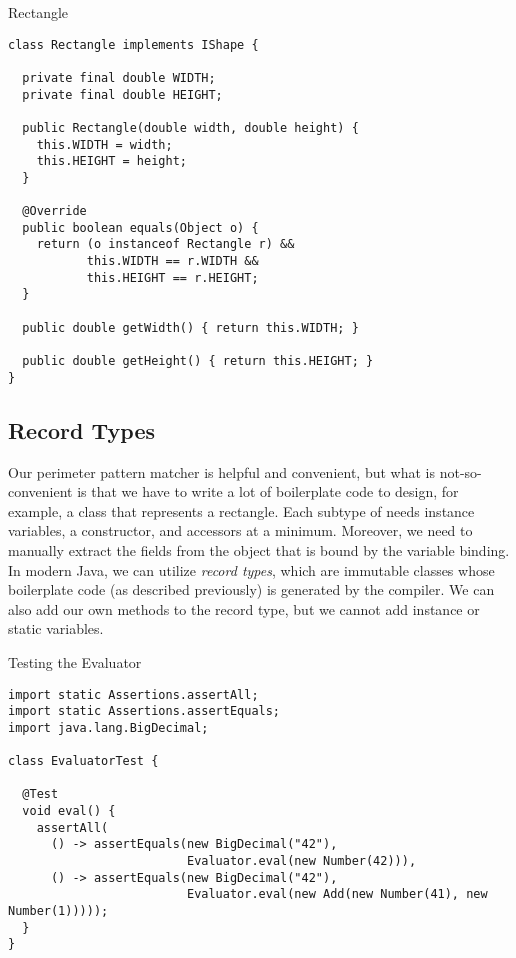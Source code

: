 \begin{cl}[]{Rectangle}
\begin{lstlisting}[language=MyJava]
class Rectangle implements IShape {

  private final double WIDTH;
  private final double HEIGHT;

  public Rectangle(double width, double height) {
    this.WIDTH = width;
    this.HEIGHT = height;
  }

  @Override
  public boolean equals(Object o) {
    return (o instanceof Rectangle r) &&
           this.WIDTH == r.WIDTH &&
           this.HEIGHT == r.HEIGHT;
  }

  public double getWidth() { return this.WIDTH; }

  public double getHeight() { return this.HEIGHT; }
}
\end{lstlisting}
\end{cl}


\subsection*{Record Types}

Our perimeter pattern matcher is helpful and convenient, but what is not-so-convenient is that we have to write a lot of boilerplate code to design, for example, a class that represents a rectangle. Each subtype of  needs instance variables, a constructor, and accessors at a minimum. Moreover, we need to manually extract the fields from the object that is bound by the variable binding. In modern Java, we can utilize \textit{record types}, which are immutable classes whose boilerplate code (as described previously) is generated by the compiler. We can also add our own methods to the record type, but we cannot add instance or static variables.


\begin{cl}[]{Testing the Evaluator}
\begin{lstlisting}[language=MyJava]
import static Assertions.assertAll;
import static Assertions.assertEquals;
import java.lang.BigDecimal;

class EvaluatorTest {

  @Test
  void eval() {
    assertAll(
      () -> assertEquals(new BigDecimal("42"),
                         Evaluator.eval(new Number(42))),
      () -> assertEquals(new BigDecimal("42"),
                         Evaluator.eval(new Add(new Number(41), new Number(1)))));
  }
}
\end{lstlisting}
\end{cl}

